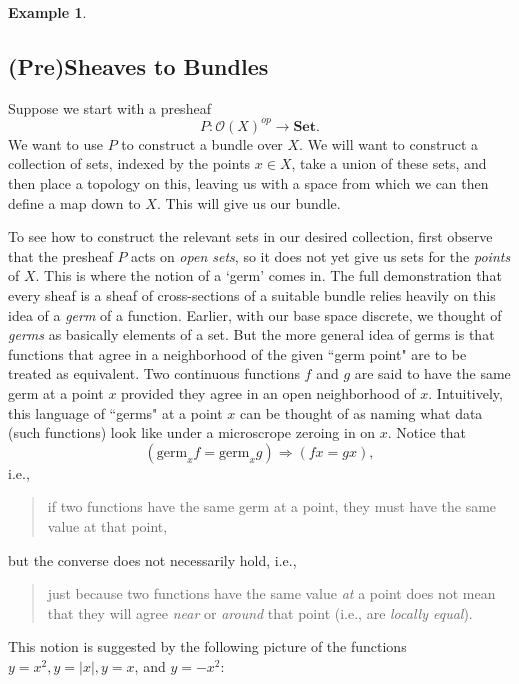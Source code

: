 \documentclass[11pt]{book}
\theoremstyle{definition}
\newtheorem{example}{Example}[section]
\theoremstyle{definition}
\theoremstyle{definition}
\theoremstyle{theorem}
\theoremstyle{definition}
\begin{document}
\begin{example}
\subsection{(Pre)Sheaves to Bundles}	
	Suppose we start with a presheaf 
	\begin{equation*}
	P: \mathscr{O}(X)^{op} \rightarrow \textbf{Set}. 
	\end{equation*}
	We want to use $P$ to construct a bundle over $X$. We will want to construct a collection of sets, indexed by the points $x \in X$, take a union of these sets, and then place a topology on this, leaving us with a space from which we can then define a map down to $X$. This will give us our bundle. \par 
	To see how to construct the relevant sets in our desired collection, first observe that the presheaf $P$ acts on \textit{open sets}, so it does not yet give us sets for the \textit{points} of $X$. This is where the notion of a `germ' comes in. The full demonstration that every sheaf is a sheaf of cross-sections of a suitable bundle relies heavily on this idea of a \textit{germ} of a function. Earlier, with our base space discrete, we thought of \textit{germs} as basically elements of a set. But the more general idea of germs is that functions that agree in a neighborhood of the given ``germ point" are to be treated as equivalent. Two continuous functions $f$ and $g$ are said to have the same germ at a point $x$ provided they agree in an open neighborhood of $x$. Intuitively, this language of ``germs" at a point $x$ can be thought of as naming what data (such functions) look like under a microscrope zeroing in on $x$. Notice that 
	\begin{equation*}
	(\text{germ}_x f = \text{germ}_x g) \Rightarrow (fx = gx),
	\end{equation*} 
	i.e., 
	\begin{quote}
		if two functions have the same germ at a point, they must have the same value at that point,
	\end{quote}
	but the converse does not necessarily hold, i.e., 
	\begin{quote}
		just because two functions have the same value \textit{at} a point does not mean that they will agree \textit{near} or \textit{around} that point (i.e., are \textit{locally equal}).   
	\end{quote}  
	This notion is suggested by the following picture of the functions $y = x^2, y = |x|, y = x$, and $y = -x^2$:  
	\begin{center} 

\end{center}
\end{example}
\end{document}
